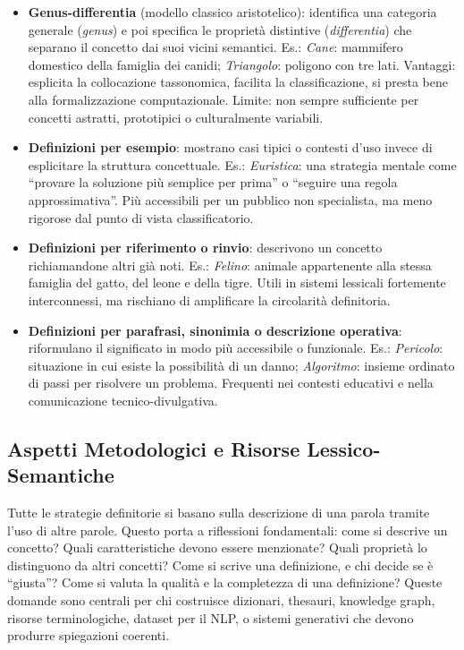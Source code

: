 \documentclass[12pt,a4paper]{article}
\begin{document}
\begin{itemize}
  \item \textbf{Genus-differentia} (modello classico aristotelico): identifica una categoria generale (\emph{genus}) e poi specifica le propriet\`a distintive (\emph{differentia}) che separano il concetto dai suoi vicini semantici. Es.: \textit{Cane}: mammifero domestico della famiglia dei canidi; \textit{Triangolo}: poligono con tre lati. Vantaggi: esplicita la collocazione tassonomica, facilita la classificazione, si presta bene alla formalizzazione computazionale. Limite: non sempre sufficiente per concetti astratti, prototipici o culturalmente variabili.
  \item \textbf{Definizioni per esempio}: mostrano casi tipici o contesti d'uso invece di esplicitare la struttura concettuale. Es.: \textit{Euristica}: una strategia mentale come ``provare la soluzione pi\`u semplice per prima'' o ``seguire una regola approssimativa''. Pi\`u accessibili per un pubblico non specialista, ma meno rigorose dal punto di vista classificatorio.
  \item \textbf{Definizioni per riferimento o rinvio}: descrivono un concetto richiamandone altri gi\`a noti. Es.: \textit{Felino}: animale appartenente alla stessa famiglia del gatto, del leone e della tigre. Utili in sistemi lessicali fortemente interconnessi, ma rischiano di amplificare la circolarit\`a definitoria.
  \item \textbf{Definizioni per parafrasi, sinonimia o descrizione operativa}: riformulano il significato in modo pi\`u accessibile o funzionale. Es.: \textit{Pericolo}: situazione in cui esiste la possibilit\`a di un danno; \textit{Algoritmo}: insieme ordinato di passi per risolvere un problema. Frequenti nei contesti educativi e nella comunicazione tecnico-divulgativa.
\end{itemize}

\subsection{Aspetti Metodologici e Risorse Lessico-Semantiche}

Tutte le strategie definitorie si basano sulla descrizione di una parola tramite l'uso di altre parole. Questo porta a riflessioni fondamentali: come si descrive un concetto? Quali caratteristiche devono essere menzionate? Quali propriet\`a lo distinguono da altri concetti? Come si scrive una definizione, e chi decide se \`e ``giusta''? Come si valuta la qualit\`a e la completezza di una definizione? Queste domande sono centrali per chi costruisce dizionari, thesauri, knowledge graph, risorse terminologiche, dataset per il NLP, o sistemi generativi che devono produrre spiegazioni coerenti.
\end{document}
